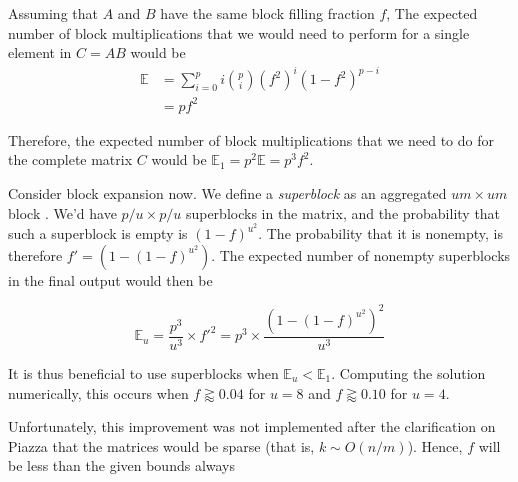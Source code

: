 \documentclass[12pt]{article}
\begin{document}
Assuming that $A$ and $B$ have the same block filling fraction $f$, The 
expected number of block multiplications that we would need to perform for a single 
element in $C = AB$ would be
\begin{align*}
    \mathbb{E} &= \sum_{i=0}^p i \binom{p}{i}\left(f^2\right)^i \left(1 - f^2\right)^{p-i} \\
               &= pf^2
\end{align*}

Therefore, the expected number of block multiplications that we need to do for 
the complete matrix $C$ would be $\mathbb{E}_1 = p^2 \mathbb{E} = p^3 f^2$.

Consider block expansion now. We define a \emph{superblock} as an aggregated
$um \times um$ block . We'd have $p/u \times p/u$ superblocks in the matrix,
and the probability that such a superblock is empty is $(1-f)^{u^2}$. The
probability that it is nonempty, is therefore $f' = (1-(1-f)^{u^2})$. The
expected number of nonempty superblocks in the final output would then be 

$$\mathbb{E}_u = \frac{p^3}{u^3} \times f'^2 = p^3 \times \frac{(1-(1-f)^{u^2})^2}{u^3}$$

It is thus beneficial to use superblocks when $\mathbb{E}_u < \mathbb{E}_1$. Computing
the solution numerically, this occurs when $f \gtrapprox 0.04$ for $u = 8$ and 
$f \gtrapprox 0.10$ for $u = 4$.

Unfortunately, this improvement was not implemented after the clarification on 
Piazza that the matrices would be sparse (that is, $k \sim O(n/m)$). Hence, $f$ 
will be less than the given bounds always
\end{document}
